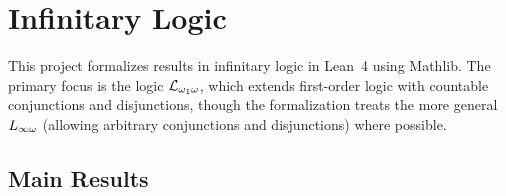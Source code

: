 



\chapter{Infinitary Logic}

This project formalizes results in infinitary logic in Lean~4 using Mathlib.
The primary focus is the logic $\mathcal{L}_{\omega_1\omega}$, which extends first-order logic
with countable conjunctions and disjunctions, though the formalization
treats the more general $L_{\infty\omega}$ (allowing arbitrary conjunctions and
disjunctions) where possible.

\section{Main Results}

